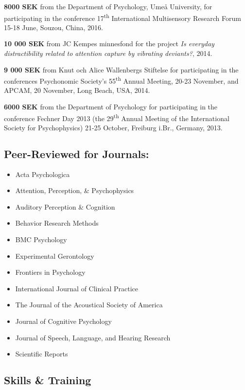 \documentclass[]{article}
\begin{document}
\textbf{8000 SEK} from the Department of Psychology, Umeå University,
for participating in the conference 17\textsuperscript{th} International
Multisensory Research Forum 15-18 June, Souzou, China, 2016.

\textbf{10 000 SEK} from JC Kempes minnesfond for the project \emph{Is
everyday distractibility related to attention capture by vibrating
deviants?}, 2014.

\textbf{9 000 SEK} from Knut och Alice Wallenbergs Stiftelse for
participating in the conferences Psychonomic Society's
55\textsuperscript{th} Annual Meeting, 20-23 November, and APCAM, 20
November, Long Beach, USA, 2014.

\textbf{6000 SEK} from the Department of Psychology for participating in
the conference Fechner Day 2013 (the 29\textsuperscript{th} Annual
Meeting of the International Society for Psychophysics) 21-25 October,
Freiburg i.Br., Germany, 2013.

\subsection{Peer-Reviewed for
Journals:}\label{peer-reviewed-for-journals}

\begin{itemize}
\item
  Acta Psychologica
\item
  Attention, Perception, \& Psychophysics
\item
  Auditory Perception \& Cognition
\item
  Behavior Research Methods
\item
  BMC Psychology
\item
  Experimental Gerontology
\item
  Frontiers in Psychology
\item
  International Journal of Clinical Practice
\item
  The Journal of the Acoustical Society of America
\item
  Journal of Cognitive Psychology
\item
  Journal of Speech, Language, and Hearing Research
\item
  Scientific Reports
\end{itemize}

\subsection{Skills \& Training}\label{skills-training}
\end{document}
